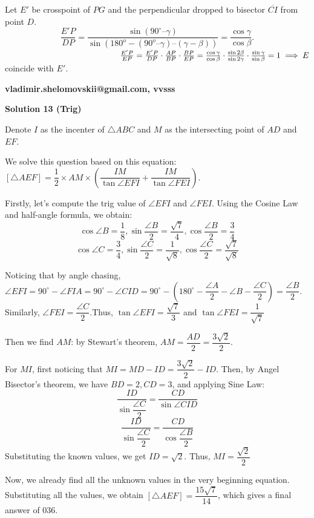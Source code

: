 \begin{enumerate}
 Let $E'$ be crosspoint of $PG$ and the perpendicular dropped to bisector $\overline{CI}$ from point $D.$ 
 \[\frac {E'P}{DP} = \frac {\sin (90^\circ – \gamma)}{\sin(180^o - (90^o – \gamma) – (\gamma - \beta))}= \frac {\cos\gamma}{\cos \beta}.\]$\hspace{50mm}\frac {E'P} {EP} = \frac {E'P}{DP} \cdot \frac {AP}{BP} \cdot \frac {BP}{EP} = \frac {\cos\gamma}{\cos \beta} \cdot \frac {\sin 2\beta}{\sin 2\gamma}\cdot \frac {\sin\gamma}{\sin \beta} = 1 \implies  E$  coincide with $E'.$

 \textbf{vladimir.shelomovskii@gmail.com, vvsss}

 



\textbf{Solution 13 (Trig)}

Denote $I$ as the incenter of $\triangle ABC$ and $M$ as the intersecting point of $AD$ and $EF$. 

 We solve this question based on this equation: $[\triangle AEF]=\dfrac{1}{2}\times AM\times (\dfrac{IM}{\tan{\angle EFI}}+\dfrac{IM}{\tan{\angle FEI}})$.

 
Firstly, let's compute the trig value of $\angle EFI$ and $\angle FEI$. Using the Cosine Law and half-angle formula, we obtain:
 \[\cos{\angle B}=\dfrac{1}{8}, \sin{\dfrac{\angle B}{2}}=\dfrac{\sqrt{7}}{4}, \cos{\dfrac{\angle B}{2}}=\dfrac{3}{4}\]
 \[\cos{\angle C}=\dfrac{3}{4}, \sin{\dfrac{\angle C}{2}}=\dfrac{1}{\sqrt{8}}, \cos{\dfrac{\angle C}{2}}=\dfrac{\sqrt{7}}{\sqrt{8}}\]

 Noticing that by angle chasing, $\angle EFI= 90^{\circ}-\angle FIA=90^{\circ}-\angle CID=90^{\circ}-(180^{\circ}-\dfrac{\angle A}{2}-\angle B-\dfrac{\angle C}{2})= \dfrac{\angle B}{2}$. Similarly, $\angle FEI=\dfrac{\angle C}{2}$.Thus, $\tan{\angle EFI}=\dfrac{\sqrt{7}}{3}$ and $\tan{\angle FEI}=\dfrac{1}{\sqrt{7}}$

 Then we find $AM$: by Stewart's theorem, $AM=\dfrac{AD}{2}=\dfrac{3\sqrt{2}}{2}$.

 For $MI$, first noticing that $MI=MD-ID=\dfrac{3\sqrt{2}}{2}-ID$. Then, by Angel Bisector's theorem, we have $BD=2, CD=3$, and applying Sine Law: 
 \[\dfrac{ID}{\sin{\dfrac{\angle C}{2}}}=\dfrac{CD}{\sin{\angle CID}}\]
 \[\dfrac{ID}{\sin{\dfrac{\angle C}{2}}}=\dfrac{CD}{\cos{\dfrac{\angle B}{2}}}\]Substituting the known values, we get $ID=\sqrt{2}$. Thus, $MI=\dfrac{\sqrt{2}}{2}$

 Now, we already find all the unknown values in the very beginning equation. Substituting all the values, we obtain $[\triangle AEF]=\dfrac{15\sqrt{7}}{14}$, which gives a final answer of $\boxed{036}$.


\end{enumerate}
